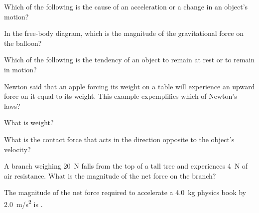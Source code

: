 \documentclass{exam}
\begin{document}
\begin{questions}

\question
Which of the following is the cause of an acceleration or a change in an object's motion?

\question
In the free-body diagram, which is the magnitude of the gravitational force on the balloon?

\begin{figure}[h!]
\centering
{}
\end{figure}

\question
Which of the following is the tendency of an object to remain at rest or to remain in motion?


\question
Newton said that an apple forcing its weight on a table will experience an upward force on it equal to its weight. This example expemplifies which of Newton's laws?

\question
What is weight?

\question
What is the contact force that acts in the direction opposite to the object's velocity?


\question
A branch weighing \SI{20}{N} falls from the top of a tall tree and experiences \SI{4}{N} of air resistance. What is the magnitude of the net force on the branch?

\question 
The magnitude of the net force required to accelerate a \SI{4.0}{kg} physics book by \SI{2.0}{m/s^2} is \fillin[\SI{8.0}{N}] .


\end{questions}
\end{document}
